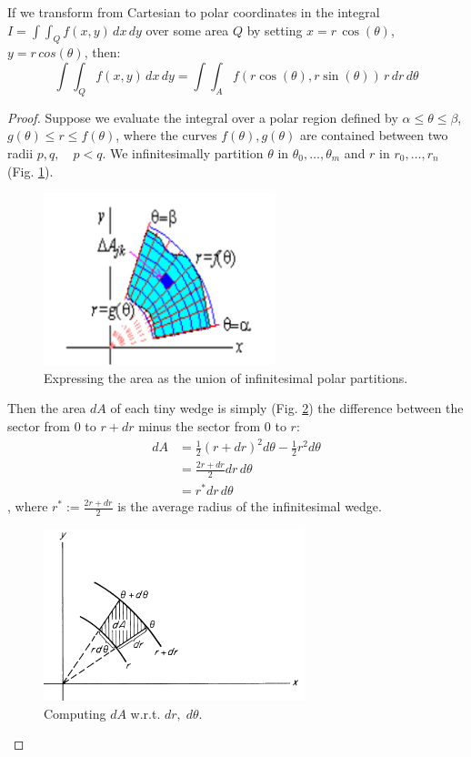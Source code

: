 \documentclass[a4paper]{article}
\begin{document}
\begin{lemma}
	If we transform from Cartesian to polar coordinates in the integral $I=\int\int_Q f(x,y)\,dx\,dy$ over some area $Q$ by setting $x=r\,\cos(\theta)$, $y=r\,cos(\theta)$, then:
	\begin{equation}
		\int\int_Q f(x,y)\,dx\,dy = \int\int_A f(r\cos(\theta), r\sin(\theta))\, r \, dr\, d\theta
	\end{equation}
\end{lemma}
	\begin{proof}
		Suppose we evaluate the integral over a polar region defined by $\alpha \leq \theta \leq \beta$, $g(\theta) \leq r \leq f(\theta)$, where the curves $f(\theta), g(\theta)$ are contained between two radii $p, q, \quad p<q$. We infinitesimally partition $\theta$ in $\theta_0,\ldots,\theta_m$ and $r$ in $r_0, \ldots, r_n$ (Fig. \ref{fig:polar_partition}).
	\begin{figure}[H]
		\centering
		\includegraphics[height=5cm]{img/int_pol_domain.png}
		\caption{Expressing the area as the union of infinitesimal polar partitions.}
		\label{fig:polar_partition}
	\end{figure}
		Then the area $dA$ of each tiny wedge is simply (Fig. \ref{fig:da_wrt_dr})	the difference between the sector from $0$ to $r+dr$ minus the sector from $0$ to $r$:
		\begin{align*}
			dA &= \frac{1}{2}(r+dr)^2d\theta - \frac{1}{2}r^2d\theta  \\
			&= \frac{2r+dr}{2}dr\,d\theta\\
			&= r^*dr\,d\theta 
		\end{align*}
	, where $r^* := \frac{2r+dr}{2}$ is the average radius of the infinitesimal wedge.
	\begin{figure}[H]
		\centering
		\includegraphics[height=5cm]{img/da_polar_partition.png}
		\caption{Computing $dA$ w.r.t. $dr,\; d\theta$.}
		\label{fig:da_wrt_dr}
	\end{figure}
	\end{proof}
\end{document}
